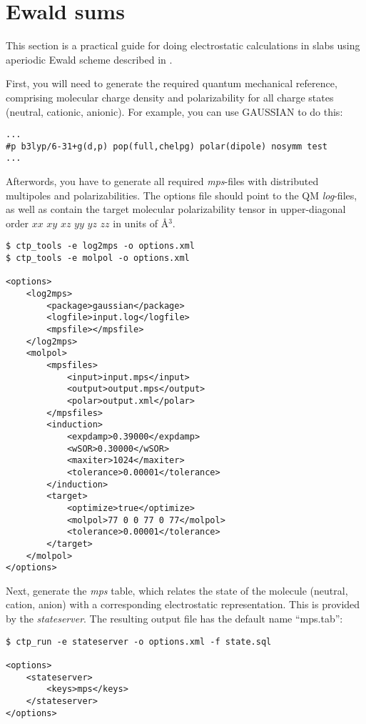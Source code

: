 \section{Ewald sums}
\label{sec:ewald}

This section is a practical guide for doing electrostatic calculations in slabs using aperiodic Ewald scheme described in \cite{poelking_long-range_2016}.

First, you will need to generate the required quantum mechanical reference, comprising molecular charge density and polarizability for all charge states (neutral, cationic, anionic). For example, you can use  GAUSSIAN to do this:
 \begin{verbatim}
...
#p b3lyp/6-31+g(d,p) pop(full,chelpg) polar(dipole) nosymm test
...
 \end{verbatim}

Afterwords, you have to generate all required {\em mps}-files with distributed multipoles and polarizabilities.  The options file should point to the QM {\em log}-files, as well as contain the target molecular polarizability tensor in upper-diagonal order $xx$ $xy$ $xz$ $yy$ $yz$ $zz$ in units of \AA$^3$.
\begin{verbatim}
$ ctp_tools -e log2mps -o options.xml
$ ctp_tools -e molpol -o options.xml

<options>
    <log2mps>
        <package>gaussian</package>
        <logfile>input.log</logfile>
        <mpsfile></mpsfile>
    </log2mps>
    <molpol>
        <mpsfiles>
            <input>input.mps</input>
            <output>output.mps</output>
            <polar>output.xml</polar>
        </mpsfiles>
        <induction>
            <expdamp>0.39000</expdamp>
            <wSOR>0.30000</wSOR>
            <maxiter>1024</maxiter>
            <tolerance>0.00001</tolerance>
        </induction>
        <target>
            <optimize>true</optimize>
            <molpol>77 0 0 77 0 77</molpol>
            <tolerance>0.00001</tolerance>
        </target>
    </molpol>
</options>
  \end{verbatim}
 
Next, generate the {\it mps} table, which relates the state of the molecule (neutral, cation, anion) with a corresponding electrostatic representation. This  is provided by the {\em stateserver}. The resulting output file has the default name ``mps.tab'':
\begin{verbatim}
$ ctp_run -e stateserver -o options.xml -f state.sql

<options>
    <stateserver>
        <keys>mps</keys>
    </stateserver>
</options>
\end{verbatim}

